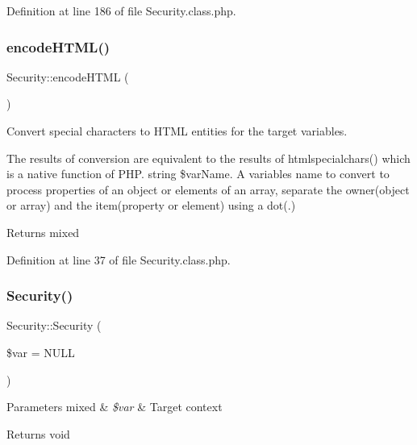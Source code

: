 Definition at line 186 of file Security.\+class.\+php.

\mbox{\label{classSecurity_a55da0eb544c3f7eeb6f818578fd0b393}} 
\subsubsection{\texorpdfstring{encode\+H\+T\+M\+L()}{encodeHTML()}}
{\footnotesize\ttfamily Security\+::encode\+H\+T\+ML (\begin{DoxyParamCaption}{ }\end{DoxyParamCaption})}


\begin{DoxyItemize}
\item Convert special characters to H\+T\+ML entities for the target variables.
\item The results of conversion are equivalent to the results of htmlspecialchars() which is a native function of P\+HP.  string \$var\+Name. A variable\textquotesingle{}s name to convert to process properties of an object or elements of an array, separate the owner(object or array) and the item(property or element) using a dot(.) \begin{DoxyReturn}{Returns}
mixed 
\end{DoxyReturn}

\end{DoxyItemize}

Definition at line 37 of file Security.\+class.\+php.

\mbox{\label{classSecurity_ab74d8099e74ecc760f9328fce70760c7}} 
\subsubsection{\texorpdfstring{Security()}{Security()}}
{\footnotesize\ttfamily Security\+::\+Security (\begin{DoxyParamCaption}\item[{}]{\$var = {\ttfamily NULL} }\end{DoxyParamCaption})}


\begin{DoxyParams}[1]{Parameters}
mixed & {\em \$var} & Target context \\
\hline
\end{DoxyParams}
\begin{DoxyReturn}{Returns}
void 
\end{DoxyReturn}


